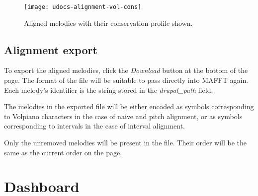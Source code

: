 \begin{figure}[h]
\centering
\texttt{[image: udocs-alignment-vol-cons]}
\caption{Aligned melodies with their conservation profile shown.}
\label{fig:align-cons}
\end{figure}

\subsection{Alignment export}

To export the aligned melodies, click the \emph{Download} button at the bottom of the page. The format of the file will be suitable to pass directly into MAFFT again. Each melody's
identifier is the string stored in the \emph{drupal\_path} field.

The melodies in the exported file will be either encoded as symbols corresponding to Volpiano characters in the case of naive and pitch alignment, or as symbols corresponding to intervals
in the case of interval alignment.

Only the unremoved melodies will be present in the file. Their order will be the same as the current order on the page.

\section{Dashboard}